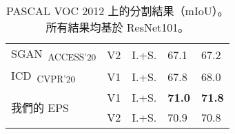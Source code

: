 \begin{table}[]
{\begin{tabular}{@{}lccll@{}}
\multicolumn{1}{l}{SGAN~\cite{yao2020saliency}\textsubscript{ACCESS'20}}                & V2        & I.+S. & 67.1                    & 67.2                     \\
\multicolumn{1}{l}{ICD~\cite{fan2020learning}\textsubscript{CVPR'20}}                   & V1        & I.+S. & 67.8                    & 68.0                     \\ \midrule
\multicolumn{1}{l}{\multirow{2}{*}{我們的 EPS}}                                            & V1        & I.+S. & \textbf{71.0}           & \textbf{71.8}            \\
\multicolumn{1}{l}{}                                                                    & V2        & I.+S. & 70.9                    & 70.8                     \\ \bottomrule
\end{tabular}
}
\vspace{2mm}
\caption{PASCAL VOC 2012 上的分割結果（mIoU）。所有結果均基於 ResNet101。}\vspace{-2mm}
\label{tab:seg_quan_voc_resnet101}
\end{table}
